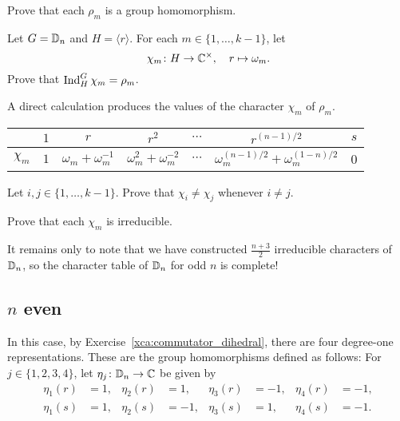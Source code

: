 \begin{exercise}
\label{xca:rho_m}
    Prove that each $\rho_m$ is a group homomorphism.
\end{exercise}

\begin{exercise}
\label{xca:Ind_chi}
    Let $G=\mathbb{D}_n$ and 
    $H=\langle r\rangle$. For each $m\in\{1,\dots,k-1\}$, 
    let 
    \[
    \chi_m\colon H\to\mathbb{C}^{\times},\quad r\mapsto\omega_m.
    \]
    Prove that 
    $\operatorname{Ind}_H^G\chi_m=\rho_m$.    
\end{exercise}

A direct calculation produces the values of the 
character $\chi_m$ of $\rho_m$.

\bigskip 
\begin{center}
    \begin{tabular}{|c|cccccc|}
         \hline 
         & $1$ & $r$ & $r^2$ & $\cdots$  & $r^{(n-1)/2}$ & $s$\\
         \hline 
         $\chi_m$ & $1$ & $\omega_m+\omega_m^{-1}$ & $\omega_m^2+\omega_m^{-2}$ & $\cdots$ & $\omega_m^{(n-1)/2}+\omega_m^{(1-n)/2}$ & 0\\
         \hline 
    \end{tabular}
\end{center}
\bigskip 

\begin{exercise}
\label{xca:chim_alldifferent}
    Let $i,j\in\{1,\dots,k-1\}$. Prove that $\chi_i\ne\chi_j$ whenever $i\ne j$.
\end{exercise}

\begin{exercise}
\label{xca:chim_irreducible}
    Prove that each $\chi_m$ is irreducible. 
\end{exercise}

It remains only to note that we have constructed 
$\frac{n+3}{2}$ irreducible characters of $\mathbb{D}_n$, 
so the character table of $\mathbb{D}_n$ for odd $n$ 
is complete!

\subsection{$n$ even}

In this case, by Exercise~\ref{xca:commutator_dihedral}, there are four 
degree-one representations. These are the group homomorphisms defined as follows: For $j\in\{1,2,3,4\}$, let $\eta_j\colon\mathbb{D}_n\to\mathbb{C}$ be given by 
\begin{align*}
    \eta_1(r)&=1, & \eta_2(r)&=1, &  \eta_3(r)&=-1, & \eta_4(r)&=-1,\\
    \eta_1(s)&=1, & \eta_2(s)&=-1, & \eta_3(s)&=1, &  \eta_4(s)&=-1.\\
\end{align*}

